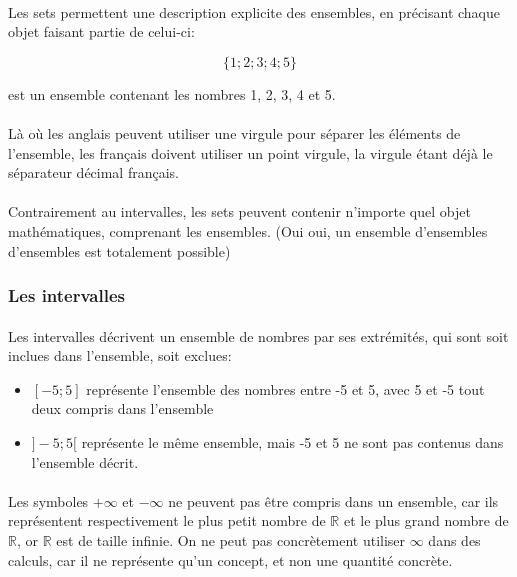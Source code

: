 \documentclass[a4paper]{book}
\begin{document}
    \paragraph{}
    Les sets permettent une description explicite des ensembles, en précisant chaque objet faisant partie de celui-ci:
    
    $$\{1; 2; 3; 4; 5\}$$
    
    est un ensemble contenant les nombres 1, 2, 3, 4 et 5.
    
    \paragraph{}
    Là où les anglais peuvent utiliser une virgule pour séparer les éléments de l'ensemble, les français doivent utiliser un point virgule, la virgule étant déjà le séparateur décimal français.
    
    \paragraph{}
    Contrairement au intervalles, les sets peuvent contenir n'importe quel objet mathématiques, comprenant les ensembles. (Oui oui, un ensemble d'ensembles d'ensembles est totalement possible)
    \subsubsection{Les intervalles}
    \paragraph{}
    Les intervalles décrivent un ensemble de nombres par ses extrémités, qui sont soit inclues dans l'ensemble, soit exclues:
    
    \begin{itemize}
        \item $[-5; 5]$ représente l'ensemble des nombres entre -5 et 5, avec 5 et -5 tout deux compris dans l'ensemble
        \item $]-5; 5[$ représente le même ensemble, mais -5 et 5 ne sont pas contenus dans l'ensemble décrit.
    \end{itemize}
    
    \paragraph{}
    Les symboles $+\infty$ et $-\infty$ ne peuvent pas être compris dans un ensemble, car ils représentent respectivement le plus petit nombre de $\mathds{R}$ et le plus grand nombre de $\mathds{R}$, or $\mathds{R}$ est de taille infinie. On ne peut pas concrètement utiliser $\infty$ dans des calculs, car il ne représente qu'un concept, et non une quantité concrète.
    
\end{document}
